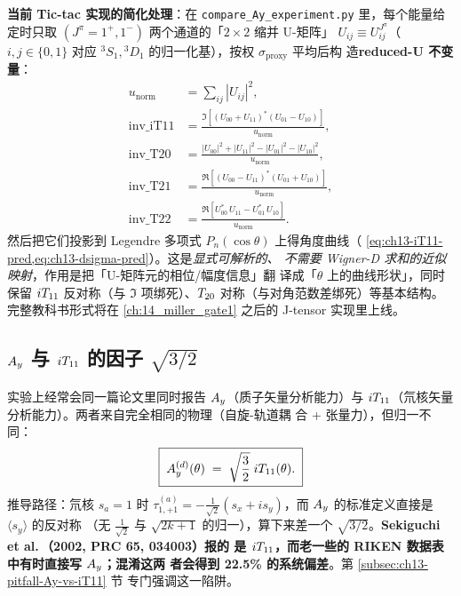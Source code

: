 \textbf{当前 Tic-tac 实现的简化处理}：在 \texttt{compare\_Ay\_experiment.py}
里，每个能量给定时只取
\((J^\pi = 1^+, 1^-)\) 两个通道的「\(2\times 2\) 缩并 U-矩阵」
\(U_{ij} \equiv U^{J^\pi}_{ij}\)（\(i, j \in \{0, 1\}\) 对应
\({}^3S_1, {}^3D_1\) 的归一化基），按权 \(\sigma_{\text{proxy}}\) 平均后构
造\textbf{reduced-U 不变量}：
\begin{align}
\label{eq:ch13-reduced-U-norm}
u_{\text{norm}} &= \sum_{ij} |U_{ij}|^2, \\
\label{eq:ch13-inv-iT11}
\text{inv\_iT11} &= \frac{\Im\!\left[(U_{00} + U_{11})^{*}(U_{01} - U_{10})\right]}{u_{\text{norm}}}, \\
\label{eq:ch13-inv-T20}
\text{inv\_T20} &= \frac{|U_{00}|^2 + |U_{11}|^2 - |U_{01}|^2 - |U_{10}|^2}{u_{\text{norm}}}, \\
\label{eq:ch13-inv-T21}
\text{inv\_T21} &= \frac{\Re\!\left[(U_{00} - U_{11})^{*}(U_{01} + U_{10})\right]}{u_{\text{norm}}}, \\
\label{eq:ch13-inv-T22}
\text{inv\_T22} &= \frac{\Re\!\left[U_{00}^{*}\,U_{11} - U_{01}^{*}\,U_{10}\right]}{u_{\text{norm}}}.
\end{align}
然后把它们投影到 Legendre 多项式 \(P_n(\cos\theta)\) 上得角度曲线（
\cref{eq:ch13-iT11-pred,eq:ch13-dsigma-pred}）。这是\emph{显式可解析的、
不需要 Wigner-D 求和的近似映射}，作用是把「U-矩阵元的相位/幅度信息」翻
译成「\(\theta\) 上的曲线形状」，同时保留 \({i T_{11}}\) 反对称（与
\(\Im\) 项绑死）、\({T_{20}}\) 对称（与对角范数差绑死）等基本结构。
完整教科书形式将在 \cref{ch:14_miller_gate1} 之后的 J-tensor 实现里上线。

\subsection{\(A_y\) 与 \({i T_{11}}\) 的因子 \(\sqrt{3/2}\)}
\label{subsec:ch13-Ay-vs-iT11}

实验上经常会同一篇论文里同时报告 \(A_y\)（质子矢量分析能力）与
\({i T_{11}}\)（氘核矢量分析能力）。两者来自完全相同的物理（自旋-轨道耦
合 + 张量力），但归一不同：
\begin{equation}
\label{eq:ch13-Ay-iT11}
\boxed{\;
A_y^{(d)}(\theta) \;=\; \sqrt{\frac{3}{2}}\;{i T_{11}}(\theta).
\;}
\end{equation}
推导路径：氘核 \(s_a = 1\) 时 \(\tau_{1,+1}^{(a)} = -\frac{1}{\sqrt{2}}(s_x +
i s_y)\)，而 \(A_y\) 的标准定义直接是 \(\langle s_y\rangle\) 的反对称
（无 \(\frac{1}{\sqrt{2}}\) 与 \(\sqrt{2k+1}\) 的归一），算下来差一个
\(\sqrt{3/2}\)。\textbf{Sekiguchi et al.\,（2002, PRC 65, 034003）报的
是 \({i T_{11}}\)，而老一些的 RIKEN 数据表中有时直接写 \(A_y\)；混淆这两
者会得到 22.5\% 的系统偏差}。第 \ref{subsec:ch13-pitfall-Ay-vs-iT11} 节
专门强调这一陷阱。

